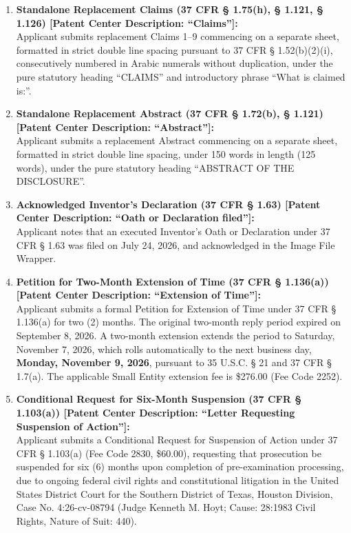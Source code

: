 \documentclass[11pt,letterpaper]{article}
\begin{document}
\begin{enumerate}[leftmargin=*]
    \item \textbf{Standalone Replacement Claims (37 CFR \S{} 1.75(h), \S{} 1.121, \S{} 1.126) [Patent Center Description: ``Claims'']:} \\
    Applicant submits replacement Claims 1--9 commencing on a separate sheet, formatted in strict double line spacing pursuant to 37 CFR \S{} 1.52(b)(2)(i), consecutively numbered in Arabic numerals without duplication, under the pure statutory heading ``CLAIMS'' and introductory phrase ``What is claimed is:''.

    \item \textbf{Standalone Replacement Abstract (37 CFR \S{} 1.72(b), \S{} 1.121) [Patent Center Description: ``Abstract'']:} \\
    Applicant submits a replacement Abstract commencing on a separate sheet, formatted in strict double line spacing, under 150 words in length (125 words), under the pure statutory heading ``ABSTRACT OF THE DISCLOSURE''.

    \item \textbf{Acknowledged Inventor's Declaration (37 CFR \S{} 1.63) [Patent Center Description: ``Oath or Declaration filed'']:} \\
    Applicant notes that an executed Inventor's Oath or Declaration under 37 CFR \S{} 1.63 was filed on July 24, 2026, and acknowledged in the Image File Wrapper.

    \item \textbf{Petition for Two-Month Extension of Time (37 CFR \S{} 1.136(a)) [Patent Center Description: ``Extension of Time'']:} \\
    Applicant submits a formal Petition for Extension of Time under 37 CFR \S{} 1.136(a) for two (2) months. The original two-month reply period expired on September 8, 2026. A two-month extension extends the period to Saturday, November 7, 2026, which rolls automatically to the next business day, \textbf{Monday, November 9, 2026}, pursuant to 35 U.S.C. \S{} 21 and 37 CFR \S{} 1.7(a). The applicable Small Entity extension fee is \$276.00 (Fee Code 2252).

    \item \textbf{Conditional Request for Six-Month Suspension (37 CFR \S{} 1.103(a)) [Patent Center Description: ``Letter Requesting Suspension of Action'']:} \\
    Applicant submits a Conditional Request for Suspension of Action under 37 CFR \S{} 1.103(a) (Fee Code 2830, \$60.00), requesting that prosecution be suspended for six (6) months upon completion of pre-examination processing, due to ongoing federal civil rights and constitutional litigation in the United States District Court for the Southern District of Texas, Houston Division, Case No. 4:26-cv-08794 (Judge Kenneth M. Hoyt; Cause: 28:1983 Civil Rights, Nature of Suit: 440).
\end{enumerate}
\end{document}
